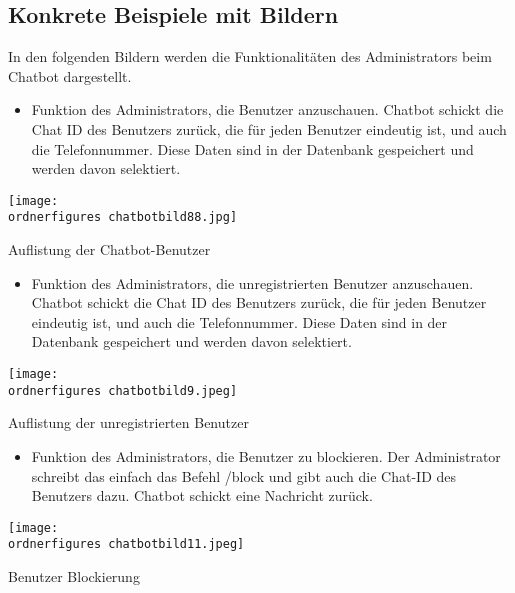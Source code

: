 \subsection{Konkrete Beispiele mit Bildern} 
In den folgenden Bildern werden die Funktionalitäten des Administrators beim Chatbot dargestellt.
\begin{itemize}
	\item Funktion des Administrators, die Benutzer anzuschauen. Chatbot schickt die Chat ID des Benutzers zurück, die für jeden Benutzer eindeutig ist, und auch die Telefonnummer. Diese Daten sind in der Datenbank gespeichert und werden davon selektiert.
\end{itemize}
\captionsetup{type=figure}
\texttt{[image: \\ordnerfigures chatbotbild88.jpg]}
\caption{Auflistung der Chatbot-Benutzer} 
\label{fig:chatbotbenutzer}
\begin{itemize}
	\item Funktion des Administrators, die unregistrierten Benutzer anzuschauen. Chatbot schickt die Chat ID des Benutzers zurück, die für jeden Benutzer eindeutig ist, und auch die Telefonnummer. Diese Daten sind in der Datenbank gespeichert und werden davon selektiert.
\end{itemize}
\captionsetup{type=figure}
\texttt{[image: \\ordnerfigures chatbotbild9.jpeg]}
\caption{Auflistung der unregistrierten Benutzer}
\label{chatbotben}
\begin{itemize}
	\item Funktion des Administrators, die Benutzer zu blockieren. Der Administrator schreibt das einfach das Befehl /block und gibt auch die Chat-ID des Benutzers dazu. Chatbot schickt eine Nachricht zurück.
\end{itemize}
\captionsetup{type=figure}
\texttt{[image: \\ordnerfigures chatbotbild11.jpeg]}
\caption{Benutzer Blockierung}
\label{fig:chatbotblock} 
\captionsetup{type=figure} 
 
